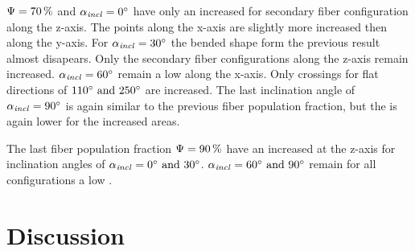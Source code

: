 \par
%
$\textnormal{$\Psi$}=\SI{70}{\percent}$ and $\textnormal{$\alpha_{\mathit{incl}}$}=\SI{0}{\degree}$ have only an increased \rvalue{} for secondary fiber configuration along the z-axis.
The points along the x-axis are slightly more increased then along the y-axis.
For $\textnormal{$\alpha_{\mathit{incl}}$}=\SI{30}{\degree}$ the bended shape form the previous result almost disapears.
Only the secondary fiber configurations along the z-axis remain increased.
$\textnormal{$\alpha_{\mathit{incl}}$}=\SI{60}{\degree}$ remain a low \rvalue{} along the x-axis.
Only crossings for flat directions of $\SIlist{110;250}{\degree}$ are increased.
The last inclination angle of $\textnormal{$\alpha_{\mathit{incl}}$}=\SI{90}{\degree}$ is again similar to the previous fiber population fraction, but the \rvalue{} is again lower for the increased areas.
\par
% 
The last fiber population fraction $\textnormal{$\Psi$}=\SI{90}{\percent}$ have an increased \rvalue{} at the z-axis for inclination angles of $\modelInc=\SIlist{0;30}{\degree}$.
$\modelInc=\SIlist{60;90}{\degree}$ remain for all configurations a low \rvalue{}.
% 
% 
% 
\section{Discussion}
%
